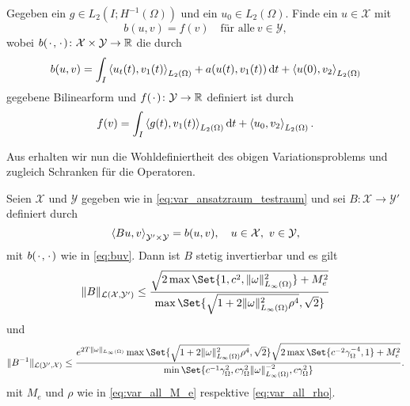\begin{Problem}
    Gegeben ein $g \in L_{2}(I; H^{-1}(\Omega))$ und ein $u_{0} \in L_{2}(\Omega)$. Finde ein $u \in \mathcal X$ mit
    \begin{equation}
        \label{eq:varprob}
        b(u, v) = f(v) \quad \text{für alle}~v \in \mathcal Y,
    \end{equation}
    wobei $b({\mkern2mu\cdot\mkern2mu}, {\mkern2mu\cdot\mkern2mu}) \colon \mathcal X \times \mathcal Y \to \mathbb{R}$ die durch
    \begin{equation}
        \label{eq:buv}
        b(u, v)
            = \int_{I} \left\langle u_{t}(t),v_{1}(t)\right\rangle_{L_{2}(\Omega)} + a(u(t), v_{1}(t)) \mathop{}\!\mathrm{d} t + \left\langle u(0),v_{2}\right\rangle_{L_{2}(\Omega)}
    \end{equation}
    gegebene Bilinearform und $f({\mkern2mu\cdot\mkern2mu}) \colon \mathcal Y \to \mathbb{R}$ definiert ist durch
    \begin{equation}
        \label{eq:var_all_f_wiederholung}
        f(v) = \int_{I} \left\langle g(t),v_{1}(t)\right\rangle_{L_{2}(\Omega)} \mathop{}\!\mathrm{d} t + \left\langle u_{0},v_{2}\right\rangle_{L_{2}(\Omega)}.
    \end{equation}
\end{Problem}

Aus  erhalten wir nun die Wohldefiniertheit des obigen Variationsproblems und zugleich Schranken für die Operatoren.

\begin{Korollar}
\label{korollar:2.2}
    Seien $\mathcal X$ und $\mathcal Y$ gegeben wie in \eqref{eq:var_ansatzraum_testraum} und sei $B \colon \mathcal X \to \mathcal Y'$ definiert durch
    \begin{equation}
        \left\langle Bu,v\right\rangle_{\mathcal Y' \times \mathcal Y}  = b(u, v), \quad u \in \mathcal X,~ v \in \mathcal Y,
    \end{equation}
    mit $b({\mkern2mu\cdot\mkern2mu}, {\mkern2mu\cdot\mkern2mu})$ wie in \eqref{eq:buv}.
    Dann ist $B$ stetig invertierbar und es gilt
    \begin{equation}
        \norm{B}_{\mathcal L(\mathcal X, \mathcal Y')}
        \leq
        \frac{\sqrt{2 \max\Set{1, c^{2}, \norm{\omega}_{L_{\infty}(\Omega)}^{2}} + M_{e}^{2}}}{\max\Set{\sqrt{1 + 2 \norm{\omega}_{L_{\infty}(\Omega)}^{2} \rho^{4}}, \sqrt{2} }}
    \end{equation}
    und
    \begin{equation}
        \norm{B^{-1}}_{\mathcal L( \mathcal Y', \mathcal X)}
        \leq \frac{e^{2 T \norm{\omega}_{L_{\infty}(\Omega)}} \max\Set{\sqrt{1 + 2 \norm{\omega}_{L_{\infty}(\Omega)}^{2} \rho^{4}}, \sqrt{2}} \sqrt{2 \max\Set{c^{-2} \gamma_{\Omega}^{-4}, 1} + M_{e}^{2}}}{\min\Set{c^{-1} \gamma_{\Omega}^{2}, c \gamma_{\Omega}^{2} \norm{\omega}_{L_{\infty}(\Omega)}^{-2}, c \gamma_{\Omega}^{2} }}.
    \end{equation}
    mit $M_{e}$ und $\rho$ wie in \eqref{eq:var_all_M_e} respektive \eqref{eq:var_all_rho}.
\end{Korollar}

